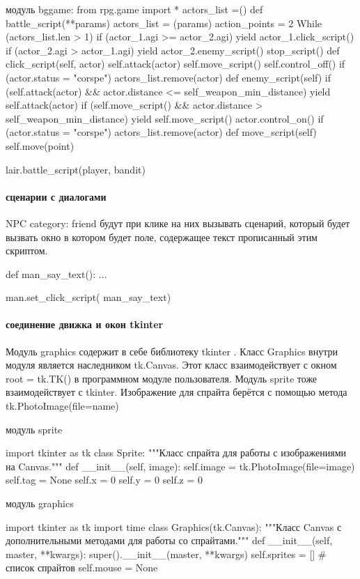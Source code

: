 модуль bggame:
from rpg.game import *
actors\_list =()
def battle\_script(**params)
	actors\_list = (params)
	action\_points = 2
	While (actors\_list.len > 1)
		if (actor\_1.agi >= actor\_2.agi)
			yield actor\_1.click\_script()
		if (actor\_2.agi > actor\_1.agi)
		yield actor\_2.enemy\_script()
	stop\_script()
def click\_script(self, actor)
	 self.attack(actor)
	 self.move\_script()
	 self.control\_off()
	 if (actor.status = "corspe")
	 	actors\_list.remove(actor)
def enemy\_script(self)
	if (self.attack(actor) \&\& actor.distance <= self\_weapon\_min\_distance)
		yield self.attack(actor)
	if (self.move\_script() \&\& actor.distance > self\_weapon\_min\_distance)
		yield self.move\_script()
	actor.control\_on()
	if (actor.status = "corspe")
		actors\_list.remove(actor)
def move\_script(self)
	self.move(point)

lair.battle\_script(player, bandit)

\paragraph{сценарии с диалогами}
NPC category: friend будут при клике на них вызывать сценарий, который будет вызвать окно в котором будет поле, содержащее текст прописанный этим скриптом. 

def man\_say\_text():
...

man.set\_click\_script( man\_say\_text)

\paragraph{соединение движка и окон tkinter}
Модуль graphics содержит в себе библиотеку tkinter . Класс Graphics внутри модуля является наследником tk.Canvas. Этот класс взаимодействует с окном root = tk.TK() в программном модуле пользователя. Модуль sprite тоже взаимодействует с tkinter. Изображение для спрайта берётся с помощью метода tk.PhotoImage(file=name)

модуль sprite

import tkinter as tk
class Sprite:
"""Класс спрайта для работы с изображениями на Canvas."""
def \_\_init\_\_(self, image):
self.image = tk.PhotoImage(file=image)
self.tag = None
self.x = 0
self.y = 0
self.z = 0

модуль graphics

import tkinter as tk
import time
class Graphics(tk.Canvas):
"""Класс Canvas с дополнительными методами для работы со спрайтами."""
def \_\_init\_\_(self, master, **kwargs):
super().\_\_init\_\_(master, **kwargs)
self.sprites = []  \# список спрайтов
self.mouse = None

